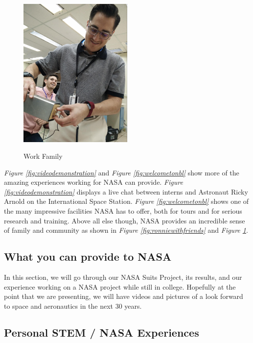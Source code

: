 \documentclass{article}
\let\Oldsubsection\subsection
\renewcommand{\subsection}{\FloatBarrier\Oldsubsection}
\begin{document}
\begin{figure}[!htb]
  \centering
  \caption{Work Family}
  \includegraphics[width=0.5\textwidth]{assets/guywithpsu.jpg}
  \label{fig:guywithpsu}
\end{figure}

\textit{Figure \ref{fig:videodemonstration}} and \textit{Figure \ref{fig:welcometonbl}} show more of the amazing experiences working for NASA can provide. \textit{Figure \ref{fig:videodemonstration}} displays a live chat between interns and Astronaut Ricky Arnold on the International Space Station. \textit{Figure \ref{fig:welcometonbl}} shows one of the many impressive facilities NASA has to offer, both for tours and for serious research and training. Above all else though, NASA provides an incredible sense of family and community as shown in \textit{Figure \ref{fig:ronniewithfriends}} and \textit{Figure \ref{fig:guywithpsu}}.

\subsection{What you can provide to NASA}

In this section, we will go through our NASA Suits Project, its results, and our experience working on a NASA project while still in college. Hopefully at the point that we are presenting, we will have videos and pictures of a look forward to space and aeronautics in the next 30 years.

\subsection{Personal STEM / NASA Experiences}
\end{document}
